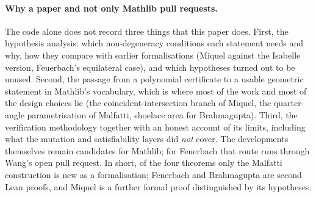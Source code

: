 \documentclass[11pt]{article}
\theoremstyle{definition}
\theoremstyle{remark}
\begin{document}
\paragraph{Why a paper and not only Mathlib pull requests.} The code alone does not record three
things that this paper does. First, the hypothesis analysis: which non-degeneracy conditions each
statement needs and why, how they compare with earlier formalisations (Miquel against the Isabelle
version, Feuerbach's equilateral case), and which hypotheses turned out to be unused. Second, the
passage from a polynomial certificate to a usable geometric statement in Mathlib's vocabulary,
which is where most of the work and most of the design choices lie (the coincident-intersection
branch of Miquel, the quarter-angle parametrisation of Malfatti, shoelace area for Brahmagupta).
Third, the verification methodology together with an honest account of its limits, including what
the mutation and satisfiability layers did \emph{not} cover. The developments themselves remain
candidates for Mathlib; for Feuerbach that route runs through Wang's open pull request.
In short, of the four theorems only the Malfatti construction is new as a formalisation;
Feuerbach and Brahmagupta are second Lean proofs, and Miquel is a further formal proof
distinguished by its hypotheses.
\end{document}
